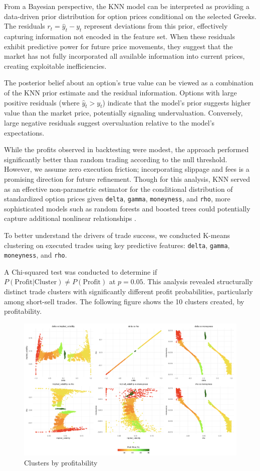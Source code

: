 \documentclass{article}
\begin{document}
From a Bayesian perspective, the KNN model can be interpreted as providing a data-driven prior distribution for option prices conditional on the selected Greeks. The residuals $r_t = \hat{y}_t - y_t$ represent deviations from this prior, effectively capturing information not encoded in the feature set. When these residuals exhibit predictive power for future price movements, they suggest that the market has not fully incorporated all available information into current prices, creating exploitable inefficiencies.

The posterior belief about an option's true value can be viewed as a combination of the KNN prior estimate and the residual information. Options with large positive residuals (where $\hat{y}_t > y_t$) indicate that the model's prior suggests higher value than the market price, potentially signaling undervaluation. Conversely, large negative residuals suggest overvaluation relative to the model's expectations.

While the profits observed in backtesting were modest, the approach performed significantly better than random trading according to the null threshold. However, we assume zero execution friction; incorporating slippage and fees is a promising direction for future refinement. Though for this analysis, KNN served as an effective non-parametric estimator for the conditional distribution of standardized option prices given \verb|delta|, \verb|gamma|, \verb|moneyness|, and \verb|rho|, more sophisticated models such as random forests and boosted trees could potentially capture additional nonlinear relationships \cite{caruana2006empirical}.

To better understand the drivers of trade success, we conducted K-means clustering on executed trades using key predictive features: \verb|delta|, \verb|gamma|, \verb|moneyness|, and \verb|rho|. 

A Chi-squared test was conducted to determine if $P(\text{Profit} | \text{Cluster}) \neq P(\text{Profit})$ at $p=0.05$. This analysis revealed structurally distinct trade clusters with significantly different profit probabilities, particularly among short-sell trades. The following figure shows the 10 clusters created, by profitability.

\begin{figure}[h]
  \centering
  \includegraphics[width=1\linewidth]{data/results/clusters.png}
  \caption{Clusters by profitability}
  \label{fig:clusters}
\end{figure}
\end{document}
